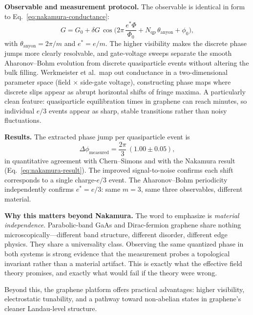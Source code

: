 \medskip
\noindent\textbf{Observable and measurement protocol.}
The observable is identical in form to Eq.~\eqref{eq:nakamura-conductance}:
\begin{equation}
  G = G_0 + \delta G\,\cos\!\Big(
    2\pi\,\frac{e^{*}\Phi}{\Phi_0} + N_{\mathrm{qp}}\,\theta_{\mathrm{anyon}} + \phi_0
  \Big),
  \label{eq:werkmeister-conductance}
\end{equation}
with $\theta_{\mathrm{anyon}} = 2\pi/m$ and $e^{*} = e/m$.  The higher visibility makes the discrete phase jumps more clearly resolvable, and gate-voltage sweeps separate the smooth Aharonov--Bohm evolution from discrete quasiparticle events without altering the bulk filling.  Werkmeister et al.\ map out conductance in a two-dimensional parameter space (field $\times$ side-gate voltage), constructing phase maps where discrete slips appear as abrupt horizontal shifts of fringe maxima.  A particularly clean feature: quasiparticle equilibration times in graphene can reach minutes, so individual $e/3$ events appear as sharp, stable transitions rather than noisy fluctuations.

\medskip
\noindent\textbf{Results.}
The extracted phase jump per quasiparticle event is
\begin{equation}
  \Delta\phi_{\mathrm{measured}} = \frac{2\pi}{3}\,(1.00 \pm 0.05),
  \label{eq:werkmeister-result}
\end{equation}
in quantitative agreement with Chern--Simons and with the Nakamura result (Eq.~\ref{eq:nakamura-result}).  The improved signal-to-noise confirms each shift corresponds to a single charge-$e/3$ event.  The Aharonov--Bohm periodicity independently confirms $e^{*} = e/3$: same $m = 3$, same three observables, different material.

\medskip
\noindent\textbf{Why this matters beyond Nakamura.}
The word to emphasize is \emph{material independence}.  Parabolic-band GaAs and Dirac-fermion graphene share nothing microscopically---different band structure, different disorder, different edge physics.  They share a universality class.  Observing the same quantized phase in both systems is strong evidence that the measurement probes a topological invariant rather than a material artifact.  This is exactly what the effective field theory promises, and exactly what would fail if the theory were wrong.

Beyond this, the graphene platform offers practical advantages: higher visibility, electrostatic tunability, and a pathway toward non-abelian states in graphene's cleaner Landau-level structure.

